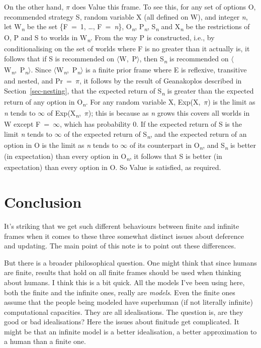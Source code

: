 \documentclass[
  12pt,
  letterpaper,
  DIV=11,
  numbers=noendperiod]{scrartcl}
\begin{document}
On the other hand, $\pi$ does Value this frame. To see this, for any set of
options O, recommended strategy S, random variable X (all defined on W),
and integer \emph{n}, let W\textsubscript{\emph{n}} be the set \{F~=~1,
\ldots, F~=~\emph{n}\}, O\textsubscript{\emph{n}},
P\textsubscript{\emph{n}}, S\textsubscript{\emph{n}} and
X\textsubscript{\emph{n}} be the restrictions of O, P and S to worlds in
W\textsubscript{\emph{n}}. From the way P is constructed, i.e., by
conditionalising on the set of worlds where F is no greater than it
actually is, it follows that if S is recommended on $\langle$W,~P$\rangle$, then
S\textsubscript{\emph{n}} is recommended on
$\langle$W\textsubscript{\emph{n}},~P\textsubscript{\emph{n}}$\rangle$. Since
$\langle$W\textsubscript{\emph{n}},~P\textsubscript{\emph{n}}$\rangle$ is a finite prior
frame where E is reflexive, transitive and nested, and Pr~=~$\pi$, it
follows by the result of Geanakoplos described in
Section~\ref{sec-nesting}, that the expected return of
S\textsubscript{\emph{n}} is greater than the expected return of any
option in O\textsubscript{\emph{n}}. For any random variable X,
Exp(X,~$\pi$) is the limit as \emph{n} tends to $\infty$ of
Exp(X\textsubscript{\emph{n}},~$\pi$); this is because as \emph{n} grows
this covers all worlds in W except F~=~$\infty$, which has probability 0. If
the expected return of S is the limit \emph{n} tends to $\infty$ of the
expected return of S\emph{\textsubscript{n}}, and the expected return of
an option in O is the limit as \emph{n} tends to $\infty$ of its counterpart in
O\textsubscript{\emph{n}}, and S\emph{\textsubscript{n}} is better (in
expectation) than every option in O\textsubscript{\emph{n}}, it follows
that S is better (in expectation) than every option in O. So Value is
satisfied, as required.

\section{Conclusion}\label{conclusion}

It's striking that we get such different behaviours between finite and
infinite frames when it comes to these three somewhat distinct issues
about deference and updating. The main point of this note is to point
out these differences.

But there is a broader philosophical question. One might think that
since humans are finite, results that hold on all finite frames should
be used when thinking about humans. I think this is a bit quick. All the
models I've been using here, both the finite and the infinite ones,
really are \emph{models}. Even the finite ones assume that the people
being modeled have superhuman (if not literally infinite) computational
capacities. They are all idealisations. The question is, are they good
or bad idealisations? Here the issues about finitude get complicated. It
might be that an infinite model is a better idealisation, a better
approximation to a human than a finite one.
\end{document}
